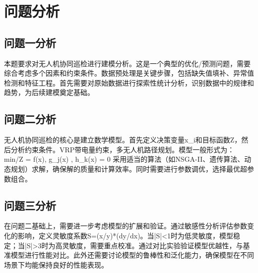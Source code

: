 \newpage
\section{问题分析}

\subsection{问题一分析}
本题要求对无人机协同巡检进行建模分析。这是一个典型的优化/预测问题，需要综合考虑多个因素和约束条件。数据预处理是关键步骤，包括缺失值填补、异常值检测和特征工程。首先需要对原始数据进行探索性统计分析，识别数据中的规律和趋势，为后续建模奠定基础。

\subsection{问题二分析}
无人机协同巡检的核心是建立数学模型。首先定义决策变量x_i和目标函数Z，然后分析约束条件。VRP带电量约束，多无人机路径规划。模型一般形式为：
\\min/\max \quad Z = f(x), \quad {} \quad g_j(x) , \; h_k(x) = 0
采用适当的算法（如NSGA-II、遗传算法、动态规划）求解，确保解的质量和计算效率。同时需要进行参数调优，选择最优超参数组合。

\subsection{问题三分析}
在问题二基础上，需要进一步考虑模型的扩展和验证。通过敏感性分析评估参数变化的影响，定义灵敏度系数S=(x/y)*(dy/dx)。当|S|<1时为低灵敏度，模型稳定；当|S|>3时为高灵敏度，需要重点校准。通过对比实验验证模型优越性，与基准模型进行性能对比。此外还需要讨论模型的鲁棒性和泛化能力，确保模型在不同场景下均能保持良好的性能表现。
